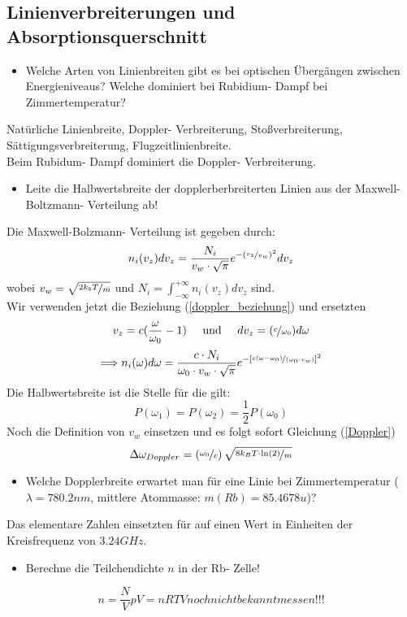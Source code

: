 \documentclass[a4paper,oneside]{article}
\begin{document}
\subsection{Linienverbreiterungen und Absorptionsquerschnitt}
\begin{itemize}
\item Welche Arten von Linienbreiten gibt es bei optischen Übergängen zwischen Energieniveaus? Welche dominiert bei Rubidium- Dampf bei Zimmertemperatur?
\end{itemize}
Natürliche Linienbreite, Doppler- Verbreiterung, Stoßverbreiterung, Sättigungsverbreiterung, Flugzeitlinienbreite.\\
Beim Rubidum- Dampf dominiert die Doppler- Verbreiterung.
\begin{itemize}
\item Leite die Halbwertsbreite der dopplerberbreiterten Linien aus der Maxwell- Boltzmann- Verteilung ab!
\end{itemize}
Die Maxwell-Bolzmann- Verteilung ist gegeben durch:
\begin{equation}
 n_i(v_z)dv_z=\frac{N_i}{v_w\cdot \sqrt{\pi}} e^{-(\nicefrac{v_z}{v_w})^2}dv_z
\end{equation}
wobei $v_w=\sqrt{\nicefrac{2k_bT}{m}}$ und $N_i=\int_{-\infty}^{+\infty}n_i(v_z)dv_z$ sind.\\
Wir verwenden jetzt die Beziehung (\ref{doppler_beziehung}) und ersetzten
\begin{equation}
 v_z=c(\frac{\omega}{\omega_0}-1)\;\;\;\;\;\text{und}\;\;\;\;\;dv_z=(\nicefrac{c}{\omega_0})d\omega
\end{equation}
\begin{equation}
 \Longrightarrow n_i(\omega)d\omega=\frac{c\cdot N_i}{\omega_0\cdot v_w\cdot \sqrt{\pi}} e^{-[\nicefrac{c(\omega-\omega_0)}{(\omega_0\cdot v_w)}]^2}
\end{equation}
Die Halbwertsbreite ist die Stelle für die gilt:
\begin{equation}
 P(\omega_1)=P(\omega_2)=\frac{1}{2}P(\omega_0)
\end{equation}
Noch die Definition von $v_w$ einsetzen und es folgt sofort Gleichung (\ref{Doppler})
\begin{equation*}
 \Delta \omega_{Doppler}=\left(\nicefrac{\omega_0}{c}\right)\sqrt{\nicefrac{8k_B T\cdot \ln(2)}{m}}
\end{equation*}

\begin{itemize}
\item Welche Dopplerbreite erwartet man für eine Linie bei Zimmertemperatur ($\lambda=780.2nm$, mittlere Atommasse: $m(Rb)=85.4678u$)?
\end{itemize}
Das elementare Zahlen einsetzten für auf einen Wert in Einheiten der Kreisfrequenz von $3.24 GHz$.
\begin{itemize}
\item Berechne die Teilchendichte $n$ in der Rb- Zelle!
\end{itemize}
\begin{equation}
 n=\frac{N}{V}
pV=nRT V noch nicht bekannt messen!!!
\end{equation}
\end{document}
